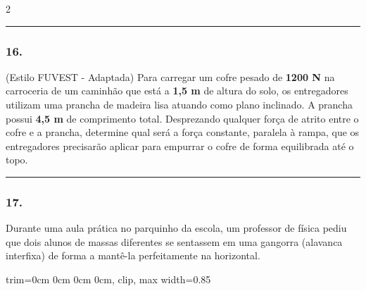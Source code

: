 \documentclass[twoside, 10pt, a4paper]{article}
\newlength{\espacoPreQuestao}
\newlength{\espacoQuestao}
\newcommand{\larguraTikz}{0.85\linewidth} %
\begin{document}
\begin{multicols*}{2}
\noindent\textcolor{CorLinha}{\rule{\linewidth}{0.5pt}} 
\par\vspace{\espacoPreQuestao}
\subsubsection*{16.} (Estilo FUVEST - Adaptada) Para carregar um cofre pesado de \textbf{1200 N} na carroceria de um caminhão que está a \textbf{1,5 m} de altura do solo, os entregadores utilizam uma prancha de madeira lisa atuando como plano inclinado. A prancha possui \textbf{4,5 m} de comprimento total. Desprezando qualquer força de atrito entre o cofre e a prancha, determine qual será a força constante, paralela à rampa, que os entregadores precisarão aplicar para empurrar o cofre de forma equilibrada até o topo.
\par\vspace{\espacoQuestao}

\noindent\textcolor{CorLinha}{\rule{\linewidth}{0.5pt}} 
\par\vspace{\espacoPreQuestao}
\subsubsection*{17.} Durante uma aula prática no parquinho da escola, um professor de física pediu que dois alunos de massas diferentes se sentassem em uma gangorra (alavanca interfixa) de forma a mantê-la perfeitamente na horizontal.
\begin{center}
\begin{adjustbox}{trim=0cm 0cm 0cm 0cm, clip, max width=\larguraTikz}
\end{adjustbox}
\end{center}
\end{multicols*}
\end{document}
